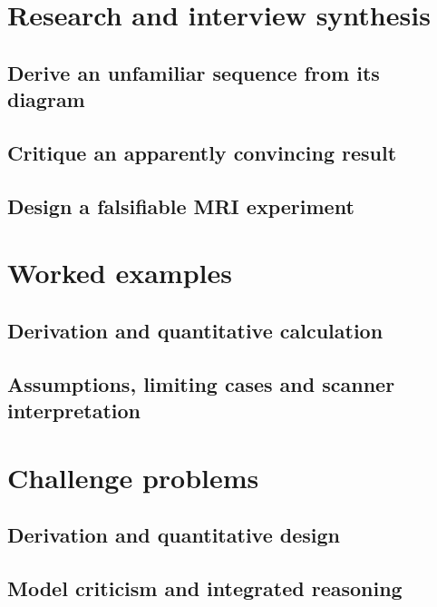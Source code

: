 \section{Research and interview synthesis}
\label{sec:27:research-and-interview-synthesis}
\subsection{Derive an unfamiliar sequence from its diagram}
\subsection{Critique an apparently convincing result}
\subsection{Design a falsifiable MRI experiment}

\section{Worked examples}
\label{sec:27:worked-examples}
\subsection{Derivation and quantitative calculation}
\subsection{Assumptions, limiting cases and scanner interpretation}

\section{Challenge problems}
\label{sec:27:challenge-problems}
\subsection{Derivation and quantitative design}
\subsection{Model criticism and integrated reasoning}
